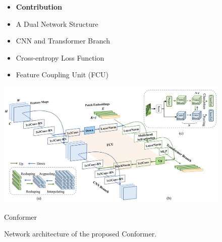 \documentclass[CJK,aspectratio=169]{beamer}  %
\begin{document}
	\begin{frame}

		\begin{figure}
			\centering
			\begin{minipage}{.4\textwidth}
				\centering
				\small
				\begin{itemize}
					\item \textbf{Contribution}
					
					\item[\checkmark]
					A Dual Network Structure
					
					\item[\checkmark]
					CNN and Transformer Branch
					
					\item[\checkmark]
					Cross-entropy Loss Function
					
					\item[\checkmark]
					Feature Coupling Unit (FCU)
				\end{itemize}
				\captionsetup{font=scriptsize}
				\label{fig: Contribution}
			\end{minipage}
			\begin{minipage}{.58\textwidth}
				\centering
				\includegraphics[width=\linewidth]{picture/LLIE/Conformer/the proposed Conformer}
				\captionsetup{font=scriptsize}
				\label{fig: Conformer}	
				\caption*{Conformer}
			\end{minipage}
			\captionsetup{font=scriptsize}
			\caption{
				\label{fig: Conformer contribution}
				Network architecture of the proposed Conformer.
			}
		\end{figure}
		
	\end{frame}
	
\end{document}

